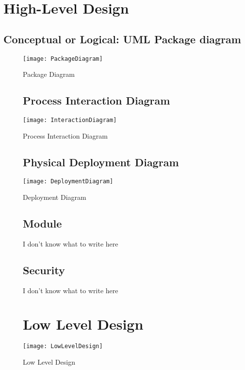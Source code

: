 \section{High-Level Design}
\subsection{Conceptual or Logical: UML Package diagram} 

\begin{figure}[ht]
\center
\texttt{[image: PackageDiagram]}
\caption{Package Diagram}
\label{fig:Package Diagram}
\end{figure}
\clearpage
\begin{figure}
\subsection{Process Interaction Diagram}
\center
\texttt{[image: InteractionDiagram]}
\caption{Process Interaction Diagram}
\label{fig:Process Interaction Diagram}
\end{figure}

\begin{figure}
\subsection{Physical Deployment Diagram}
\center
\texttt{[image: DeploymentDiagram]}
\caption{Deployment Diagram}
\label{fig:Deployment Diagram}
\end{figure}

\begin{figure}

\subsection{Module} 
I don’t know what to write here
\end{figure}
\begin{figure}

\subsection{Security} 		

 I don’t know what to write here
\end{figure}

\begin{figure}

\section{Low Level Design} 
\center
\texttt{[image: LowLevelDesign]}
\caption{Low Level Design}
\label{fig:Low Level Design}
\end{figure}

